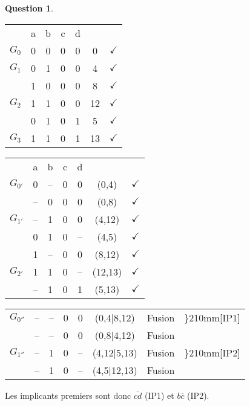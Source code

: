 \documentclass[11pt,a4paper,dvipsnames]{article}
\theoremstyle{definition}%
\newtheorem{Q}{Question}[] %
\begin{document}
\begin{Q}
\begin{enumerate}
{		\begin{minipage}{0.5\textwidth}
			\begin{tabular}{ccccccc}
			 & a & b & c & d & & \\
			 $G_0$ & 0 & 0 & 0 & 0 & 0 & $\checkmark$ \\ \hline
			 $G_1$ & 0 & 1 & 0 & 0 & 4 & $\checkmark$ \\
			 & 1 & 0 & 0 & 0 & 8 & $\checkmark$ \\ \hline
			 $G_2$ & 1 & 1 & 0 & 0 & 12 & $\checkmark$ \\
			 & 0 & 1 & 0 & 1 & 5 & $\checkmark$ \\ \hline
			 $G_3$ & 1 & 1 & 0 & 1 & 13 & $\checkmark$ \\
			\end{tabular}
		\end{minipage}%
		\begin{minipage}{0.5\textwidth}
			\begin{tabular}{ccccccc}
			 & a & b & c & d & & \\
			 $G_{0'}$ & 0 & -- & 0 & 0 & (0,4) & $\checkmark$ \\
			 & -- & 0 & 0 & 0 & (0,8) & $\checkmark$ \\ \hline
			 $G_{1'}$ & -- & 1 & 0 & 0 & (4,12) & $\checkmark$ \\
			 & 0 & 1 & 0 & -- & (4,5) & $\checkmark$ \\
			 & 1 & -- & 0 & 0 & (8,12) & $\checkmark$ \\ \hline
			 $G_{2'}$ & 1 & 1 & 0 & -- & (12,13) & $\checkmark$ \\
			 & -- & 1 & 0 & 1 & (5,13) & $\checkmark$ \\
			\end{tabular}
		\end{minipage}
		\begin{center}
			\begin{tabular}{cccccccc}
			$G_{0''}$ & -- & -- & 0 & 0 & (0,4|8,12) & Fusion & \rdelim\}{2}{10mm}[IP1] \\
			& -- & -- & 0 & 0 & (0,8|4,12) & Fusion \\ \hline
			$G_{1''}$ & -- & 1 & 0 & -- & (4,12|5,13) & Fusion & \rdelim\}{2}{10mm}[IP2] \\
			& -- & 1 & 0 & -- & (4,5|12,13) & Fusion \\
			\end{tabular}
		\end{center}

		Les implicants premiers sont donc $\overline{cd}$ (IP1) et $b\overline{c}$ (IP2).

}
\end{enumerate}
\end{Q}
\end{document}
